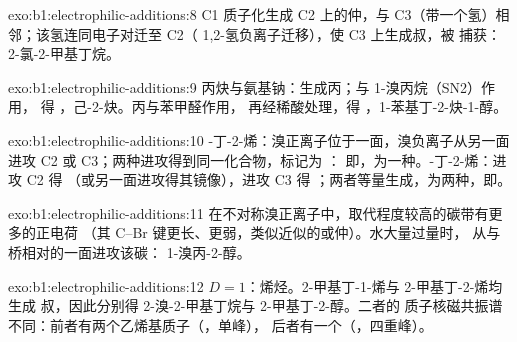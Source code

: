 \begin{solution}{exo:b1:electrophilic-additions:8}
C1 质子化生成 C2 上的仲，与
C3（带一个氢）相邻；该氢连同电子对迁至 C2（
1,2-氢负离子迁移），使 C3 上生成叔，被
 捕获：2-氯-2-甲基丁烷。
\end{solution}

\begin{solution}{exo:b1:electrophilic-additions:9}
丙炔与氨基钠：生成丙；与 1-溴丙烷（SN2）作用，
得 ，己-2-炔。丙与苯甲醛作用，
再经稀酸处理，得 ，1-苯基丁-2-炔-1-醇。
\end{solution}

\begin{solution}{exo:b1:electrophilic-additions:10}
-丁-2-烯：溴正离子位于一面，溴负离子从另一面进攻 C2
或 C3；两种进攻得到同一化合物，标记为 ：
即，为一种。-丁-2-烯：进攻 C2 得
（或另一面进攻得其镜像），进攻 C3 得
；两者等量生成，为两种，即。
\end{solution}

\begin{solution}{exo:b1:electrophilic-additions:11}
在不对称溴正离子中，取代程度较高的碳带有更多的正电荷
（其 C--Br 键更长、更弱，类似近似的或仲）。水大量过量时，
从与桥相对的一面进攻该碳：
1-溴丙-2-醇。
\end{solution}

\begin{solution}{exo:b1:electrophilic-additions:12}
$D = 1$：烯烃。2-甲基丁-1-烯与 2-甲基丁-2-烯均生成
叔，因此分别得 2-溴-2-甲基丁烷与 2-甲基丁-2-醇。二者的
质子核磁共振谱不同：前者有两个乙烯基质子（，单峰），
后者有一个（，四重峰）。
\end{solution}

